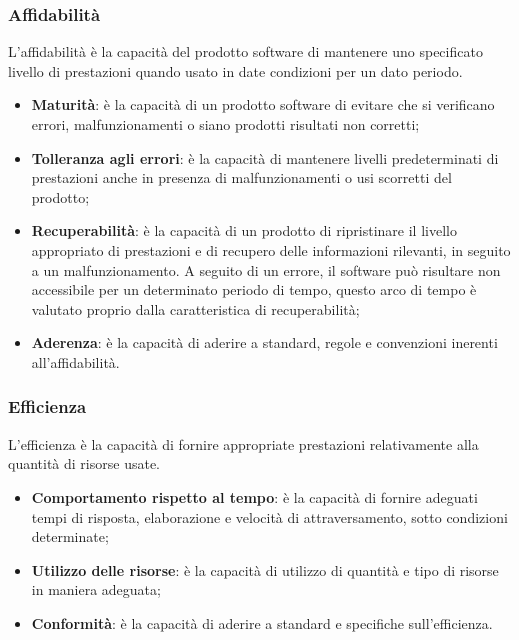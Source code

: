 \subsubsection{Affidabilità}
L'affidabilità è la capacità del prodotto software di mantenere uno specificato livello di prestazioni quando usato in date condizioni per un dato periodo.

\begin{itemize}

    \item \textbf{Maturità}: è la capacità di un prodotto software di evitare che si verificano errori, malfunzionamenti o siano prodotti risultati non corretti;
    
    \item \textbf{Tolleranza agli errori}: è la capacità di mantenere livelli predeterminati di prestazioni anche in presenza di malfunzionamenti o usi scorretti del prodotto;
    
    \item \textbf{Recuperabilità}: è la capacità di un prodotto di ripristinare il livello appropriato di prestazioni e di recupero delle informazioni rilevanti, in seguito a un malfunzionamento. A seguito di un errore, il software può risultare non accessibile per un determinato periodo di tempo, questo arco di tempo è valutato proprio dalla caratteristica di recuperabilità;
    
    \item \textbf{Aderenza}: è la capacità di aderire a standard, regole e convenzioni inerenti all'affidabilità.
    
\end{itemize}

\subsubsection{Efficienza}
L'efficienza è la capacità di fornire appropriate prestazioni relativamente alla quantità di risorse usate.

\begin{itemize}

    \item \textbf{Comportamento rispetto al tempo}: è la capacità di fornire adeguati tempi di risposta, elaborazione e velocità di attraversamento, sotto condizioni determinate;
    
    \item \textbf{Utilizzo delle risorse}: è la capacità di utilizzo di quantità e tipo di risorse in maniera adeguata;
    
    \item \textbf{Conformità}: è la capacità di aderire a standard e specifiche sull'efficienza.
    
\end{itemize}

